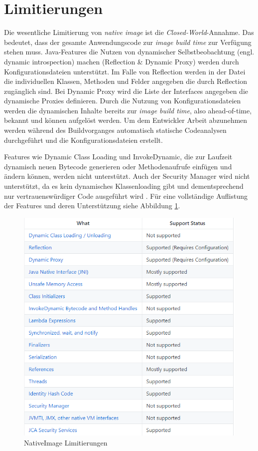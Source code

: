 \section{Limitierungen}
\label{sec:limitierungen}

Die wesentliche Limitierung von \textit{native image} ist die \textit{Closed-World}-Annahme. Das bedeutet, dass der gesamte Anwendungscode zur \textit{image build time} zur Verfügung
stehen muss. Java-Features die Nutzen von dynamischer Selbstbeobachtung (engl. dynamic introspection) machen (Reflection \& Dynamic Proxy) werden durch Konfigurationsdateien unterstützt.
Im Falle von Reflection werden in der Datei die individuellen Klassen, Methoden  und Felder angegeben die durch Reflection zugänglich sind. Bei Dynamic Proxy wird die Liste der Interfaces
angegeben die dynamische Proxies definieren. Durch die Nutzung von Konfigurationsdateien werden die dynamischen Inhalte bereits zur \textit{image build time}, also ahead-of-time, bekannt und
können aufgelöst werden. Um dem Entwickler Arbeit abzunehmen werden während des Buildvorganges automatisch statische Codeanalysen durchgeführt und die Konfigurationsdateien erstellt.

Features wie Dynamic Class Loading und InvokeDynamic, die zur Laufzeit dynamisch neuen Bytecode generieren oder Methodenaufrufe einfügen und ändern können, werden nicht unterstützt.
Auch der Security Manager wird nicht unterstützt, da es kein dynamisches Klassenloading gibt und dementsprechend nur vertrauenswürdiger Code ausgeführt wird \parencite{GraalLimitiations}.
Für eine vollständige Auflistung der Features und deren Unterstützung siehe Abbildung \ref{fig:system_limitations}.
\newpage
\begin{figure}[h]
	\centering
	\includegraphics[width=1\textwidth]{resources/limitations.png}
	\caption{NativeImage Limitierungen \parencite{GraalLimitiations}}
	\label{fig:system_limitations}
\end{figure}
\newpage
